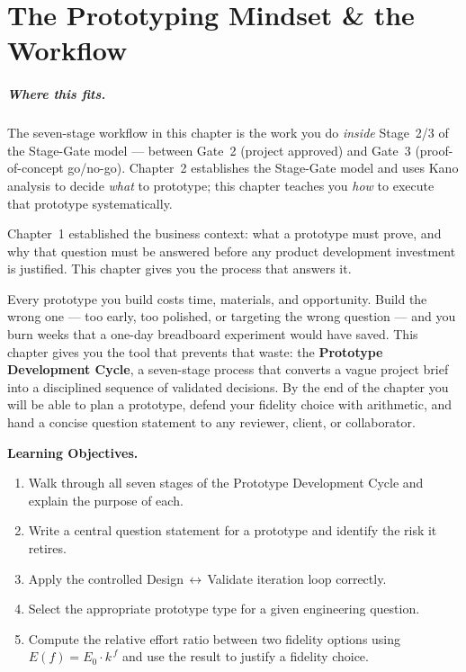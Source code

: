 \chapter{The Prototyping Mindset \& the Workflow}
\label{ch3}

\paragraph{Where this fits.}
The seven-stage workflow in this chapter is the work you do \emph{inside}
Stage~2/3 of the Stage-Gate model --- between Gate~2 (project approved)
and Gate~3 (proof-of-concept go/no-go).
Chapter~2 establishes the Stage-Gate model and uses Kano analysis to decide
\emph{what} to prototype; this chapter teaches you \emph{how} to execute
that prototype systematically.

Chapter~1 established the business context: what a prototype must prove,
and why that question must be answered before any product development
investment is justified.
This chapter gives you the process that answers it.

Every prototype you build costs time, materials, and opportunity.
Build the wrong one --- too early, too polished, or targeting the wrong
question --- and you burn weeks that a one-day breadboard experiment would
have saved.
This chapter gives you the tool that prevents that waste: the
\textbf{Prototype Development Cycle}, a
seven-stage process that converts a vague project brief into a disciplined
sequence of validated decisions.
By the end of the chapter you will be able to plan a prototype, defend your
fidelity choice with arithmetic, and hand a concise question statement to
any reviewer, client, or collaborator.

\bigskip
\noindent\textbf{Learning Objectives.}
\begin{enumerate}
  \item Walk through all seven stages of the Prototype Development Cycle and
        explain the purpose of each.
  \item Write a central question statement for a prototype and identify the risk it retires.
  \item Apply the controlled Design\,$\leftrightarrow$\,Validate iteration
        loop correctly.
  \item Select the appropriate prototype type for a given engineering question.
  \item Compute the relative effort ratio between two fidelity options using $E(f) = E_0 \cdot k^{\,f}$ and use the result to justify a fidelity choice.
\end{enumerate}

